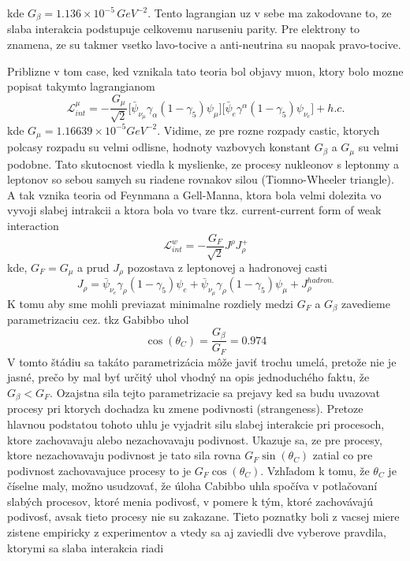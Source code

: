 \documentclass[../../main.tex]{subfiles}
\begin{document}
kde $G_{\beta}=1.136 \times 10^{-5}\,GeV^{-2}$. Tento lagrangian uz v sebe ma zakodovane to, ze slaba interakcia podstupuje celkovemu naruseniu parity. Pre elektrony to znamena, ze su takmer vsetko lavo-tocive a anti-neutrina su naopak pravo-tocive.\par
Priblizne v tom case, ked vznikala tato teoria bol objavy muon, ktory bolo mozne popisat takymto lagrangianom
\begin{equation}
\mathcal{L}^{\mu}_{int}=-\frac{G_{\mu}}{\sqrt{2}}\big[ \bar{\psi}_{\nu_{\mu}}\gamma_{\alpha}(1-\gamma_5)\psi_{\mu} \big] \big[ \bar{\psi}_e\gamma^{\alpha}(1-\gamma_5)\psi_{\nu_{e}} \big]+h.c.
\end{equation}
kde $G_{\mu}=1.16639\times 10^{-5} GeV^{-2}$. Vidime, ze pre rozne rozpady castic, ktorych polcasy rozpadu su velmi odlisne, hodnoty vazbovych konstant $G_{\beta}$ a $G_{\mu}$ su velmi podobne. Tato skutocnost viedla k myslienke, ze procesy nukleonov s leptonmy a leptonov so sebou samych su riadene rovnakov silou (Tiomno-Wheeler triangle). A tak vznika teoria od Feynmana a Gell-Manna, ktora bola velmi dolezita vo vyvoji slabej intrakcii a ktora bola vo tvare tkz. current-current form of weak interaction
\begin{equation}
\mathcal{L}^{w}_{int}=-\frac{G_F}{\sqrt{2}}J^{\rho}J^{+}_{\rho}
\end{equation} 
kde, $G_F = G_{\mu}$ a prud $J_{\rho}$ pozostava z leptonovej a hadronovej casti
\begin{equation}
J_{\rho}=\bar{\psi}_{\nu_{e}}\gamma_{\rho}(1-\gamma_5)\psi_{e} + \bar{\psi}_{\nu_{\mu}}\gamma_{\rho}(1-\gamma_5)\psi_{\mu}+J_{\rho}^{hadron.}
\end{equation}
K tomu aby sme mohli previazat minimalne rozdiely medzi $G_F$ a 
$G_{\beta}$ zavedieme parametrizaciu cez. tkz Gabibbo uhol
\begin{equation}
\cos (\theta_C)=\frac{G_{\beta}}{G_{F}}=0.974
\end{equation}
V tomto štádiu sa takáto parametrizácia môže javiť trochu umelá, pretože nie je jasné, prečo by mal byť určitý uhol vhodný na opis jednoduchého faktu, že $G_{\beta}<G_F$. Ozajstna sila tejto parametrizacie sa prejavy ked sa budu uvazovat procesy pri ktorych dochadza ku zmene podivnosti (strangeness). Pretoze hlavnou podstatou tohoto uhlu je vyjadrit silu slabej interakcie pri procesoch, ktore zachovavaju alebo nezachovavaju podivnost. Ukazuje sa, ze pre procesy, ktore nezachovavaju podivnost je tato sila rovna $G_F\sin(\theta_C)$ zatial co pre podivnost zachovavajuce procesy to je $G_F\cos(\theta_C)$. Vzhľadom k tomu, že $\theta_C$ je číselne maly, možno usudzovať, že úloha Cabibbo uhla spočíva v potlačovaní slabých procesov, ktoré menia podivosť, v pomere k tým, ktoré zachovávajú podivosť, avsak tieto procesy nie su zakazane. Tieto poznatky boli z vacsej miere zistene empiricky z experimentov a vtedy sa aj zaviedli dve vyberove pravdila, ktorymi sa slaba interakcia riadi
\end{document}
